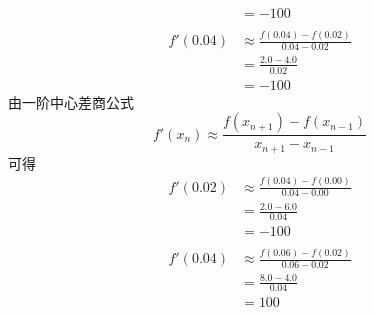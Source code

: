 \documentclass[11pt]{article}
\begin{document}
\begin{question}
{\begin{align*}
                     & = -100                                        \\
            \\
            f'(0.04) & \approx \frac{f(0.04) - f(0.02)}{0.04 - 0.02} \\
                     & = \frac{2.0 - 4.0}{0.02}                      \\
                     & = -100
        \end{align*}
        由一阶中心差商公式
        \begin{equation*}
            f'(x_n) \approx \frac{f(x_{n + 1}) - f(x_{n - 1})}{x_{n + 1} - x_{n - 1}}
        \end{equation*}
        可得
        \begin{align*}
            f'(0.02) & \approx \frac{f(0.04) - f(0.00)}{0.04 - 0.00} \\
                     & = \frac{2.0 - 6.0}{0.04}                      \\
                     & = -100                                        \\
            \\
            f'(0.04) & \approx \frac{f(0.06) - f(0.02)}{0.06 - 0.02} \\
                     & = \frac{8.0 - 4.0}{0.04}                      \\
                     & = 100
        \end{align*}
    }
\end{question}
\end{document}
